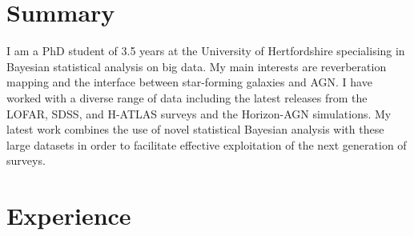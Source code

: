 \documentclass[letterpaper]{twentysecondcv} %
\begin{document}
\makeprofile %
 

\section{Summary}
     I am a PhD student of 3.5 years at the University of Hertfordshire specialising in Bayesian statistical analysis on big data. 
My main interests are reverberation mapping and the interface between star-forming galaxies and AGN. 
I have worked with a diverse range of data including the latest releases from the LOFAR, SDSS, and H-ATLAS surveys and the Horizon-AGN simulations. 
My latest work combines the use of novel statistical Bayesian analysis with these large datasets in order to facilitate effective exploitation of the 
next generation of surveys.


\section{Experience}
\end{document}
